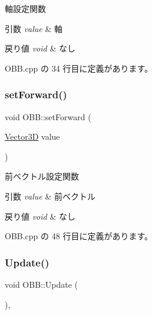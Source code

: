軸設定関数 


\begin{DoxyParams}{引数}
{\em value} & 軸 \\
\hline
\end{DoxyParams}

\begin{DoxyRetVals}{戻り値}
{\em void} & なし \\
\hline
\end{DoxyRetVals}


 O\+B\+B.\+cpp の 34 行目に定義があります。

\mbox{\label{class_o_b_b_add9c062d91d4226f7cabf484e104d259}} 
\subsubsection{\texorpdfstring{set\+Forward()}{setForward()}}
{\footnotesize\ttfamily void O\+B\+B\+::set\+Forward (\begin{DoxyParamCaption}\item[{\mbox{\hyperlink{class_vector3_d}{Vector3D}}}]{value }\end{DoxyParamCaption})}



前ベクトル設定関数 


\begin{DoxyParams}{引数}
{\em value} & 前ベクトル \\
\hline
\end{DoxyParams}

\begin{DoxyRetVals}{戻り値}
{\em void} & なし \\
\hline
\end{DoxyRetVals}


 O\+B\+B.\+cpp の 48 行目に定義があります。

\mbox{\label{class_o_b_b_af9b3e9a2d810f5b37cf849a3804d7bc7}} 
\subsubsection{\texorpdfstring{Update()}{Update()}}
{\footnotesize\ttfamily void O\+B\+B\+::\+Update (\begin{DoxyParamCaption}{ }\end{DoxyParamCaption})\hspace{0.3cm}{\ttfamily [override]}, {\ttfamily [virtual]}}



